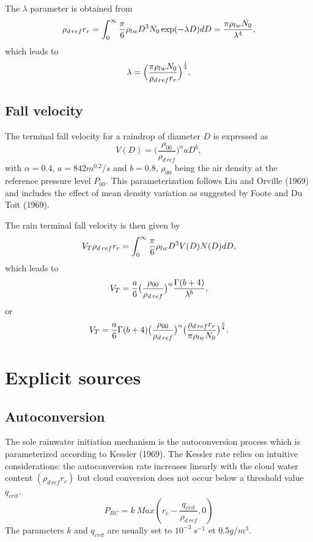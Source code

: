 The $\lambda$ parameter is obtained from
\begin{equation}
 \rho_{d\,ref} r_r=\int_0^\infty {\pi \over 6} \rho_{lw} D^3 N_0 \exp(-\lambda D)dD=
{\pi \rho_{lw} N_0 \over \lambda^4},
\end{equation}
which leads to
\begin{equation}
\lambda= \Big({\pi \rho_{lw} N_0 \over \rho_{d\,ref} r_r}\Big)^{1 \over 4}.
\end{equation}
\subsection{Fall velocity}
The terminal fall velocity for a raindrop of diameter $D$ is expressed as
\begin{equation}
V(D)=  \big( \dfrac{ \rho_{00}}{ \rho_{d\,ref}} \big)^{\alpha} aD ^{b},
\label{eqvterm}
\end{equation}
with $\alpha=0.4$, $a=842 m^{0.2}/s$ and $b=0.8$, $\rho_{00}$ being the air
density at the reference pressure level $P_{00}$.
This parameterization follows Liu and Orville (1969) and includes the
effect of mean density variation as suggested by Foote and Du Toit (1969).

The rain terminal fall velocity is then given by
\begin{equation}
V_T \rho_{d\,ref} r_r= \int_0^\infty {\pi \over 6} \rho_{lw} D^3 V(D) N(D)dD,
\end{equation}
which leads to
\begin{equation}
V_T = {a \over 6} \big( {\rho_{00}\over \rho_{d\,ref}}\big) ^\alpha
{\Gamma(b+4)\over \lambda ^b},
\end{equation}
or
\begin{equation}
V_T= {a \over 6} \Gamma(b+4)\big( {\rho_{00}\over \rho_{d\,ref}}\big) ^\alpha
\big( {\rho_{d\,ref} r_r \over \pi \rho_{lw} N_0}\big)
^{b \over 4}.
\end{equation}
\section{Explicit sources}

\subsection{Autoconversion}
The sole rainwater initiation mechanism is the autoconversion process which is
parameterized according to Kessler (1969).
The Kessler rate relies on intuitive considerations:
the autoconversion rate increases linearly with the cloud water content
$(\rho_{d\,ref} r_c)$ but
cloud conversion does not occur below a threshold value $ q_{crit}$.
\begin{equation}
P_{RC}= k\  Max( r_c - \dfrac{q_{crit}}{\rho_{d\,ref}}, 0)
\end{equation}
The parameters $k$ and $q_{crit}$ are
usually set to $10^{-3}\ s^{-1}$ et $0.5g/m^3$.

